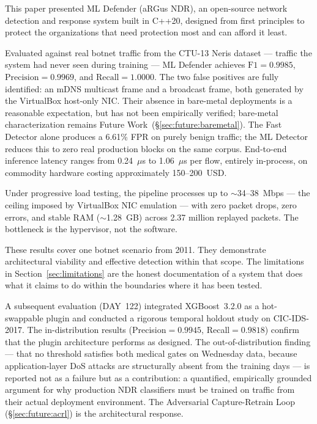 \documentclass[11pt,a4paper]{article}
\begin{document}
    This paper presented ML Defender (aRGus NDR), an open-source network detection and response
    system built in C++20, designed from first principles to protect the organizations that need
    protection most and can afford it least.

    Evaluated against real botnet traffic from the CTU-13 Neris dataset --- traffic the system
    had never seen during training --- ML Defender achieves $\text{F1} = 0.9985$,
    $\text{Precision} = 0.9969$, and $\text{Recall} = 1.0000$. The two false positives are fully
    identified: an mDNS multicast frame and a broadcast frame, both generated by the VirtualBox host-only NIC.
    Their absence in bare-metal deployments is a reasonable expectation, but has not been empirically verified;
    bare-metal characterization remains Future Work~(\S\ref{sec:future:baremetal}). The
    Fast Detector alone produces a 6.61\% FPR on purely benign traffic; the ML Detector reduces
    this to zero real production blocks on the same corpus. End-to-end inference latency ranges
    from 0.24~$\mu$s to 1.06~$\mu$s per flow, entirely in-process, on commodity hardware costing
    approximately 150--200~USD.

    Under progressive load testing, the pipeline processes up to ${\sim}$34--38~Mbps --- the
    ceiling imposed by VirtualBox NIC emulation --- with zero packet drops, zero errors, and
    stable RAM (${\sim}$1.28~GB) across 2.37 million replayed packets. The bottleneck is the
    hypervisor, not the software.

    These results cover one botnet scenario from 2011. They demonstrate architectural viability
    and effective detection within that scope. The limitations in Section~\ref{sec:limitations}
    are the honest documentation of a system that does what it claims to do within the boundaries
    where it has been tested.

    A subsequent evaluation (DAY~122) integrated XGBoost~3.2.0 as a hot-swappable plugin and
    conducted a rigorous temporal holdout study on CIC-IDS-2017. The in-distribution results
    (Precision$=0.9945$, Recall$=0.9818$) confirm that the plugin architecture performs as
    designed. The out-of-distribution finding --- that no threshold satisfies both medical gates
    on Wednesday data, because application-layer DoS attacks are structurally absent from the
    training days --- is reported not as a failure but as a contribution: a quantified,
    empirically grounded argument for why production NDR classifiers must be trained on traffic
    from their actual deployment environment. The Adversarial Capture-Retrain Loop
    (\S\ref{sec:future:acrl}) is the architectural response.
\end{document}
